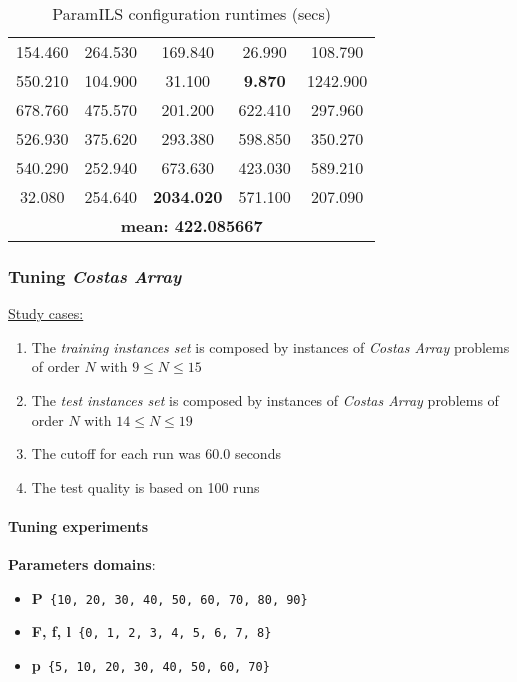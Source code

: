 \begin{table}[H]
\caption{ParamILS configuration runtimes (secs)}
\centering
\renewcommand{\arraystretch}{1.2}
\begin{tabular}{|ccccc|}
	\hline
	154.460 & 264.530 & 169.840 & 26.990 & 108.790 \\ 
	550.210 & 104.900 & 31.100 & \textcolor{naranja}{\bf 9.870} & 1242.900 \\  
	\hline 
	678.760 & 475.570 & 201.200 & 622.410 & 297.960 \\ 
	526.930 & 375.620 & 293.380 & 598.850 & 350.270 \\  
	\hline 
	540.290 & 252.940 & 673.630 & 423.030 & 589.210 \\ 
	32.080 & 254.640 & \textcolor{intenso}{\bf 2034.020} & 571.100 & 207.090 \\  
	\hline 
	\multicolumn{5}{|c|}{\bf mean: 422.085667}\\
	\hline
\end{tabular}
\label{table:testaigood}
\end{table} 

\subsubsection{ Tuning \textbf{\it Costas Array}}

\underline{Study cases:}
\begin{enumerate}
	\item The {\it training instances set} is composed by instances of {\it Costas Array} problems of order $N$ with $9 \leq N \leq 15$
	\item The {\it test instances set} is composed by instances of {\it Costas Array} problems of order $N$ with $14 \leq N \leq 19$
	\item The cutoff for each run was 60.0 seconds
	\item The test quality is based on 100 runs
\end{enumerate}

\paragraph{ Tuning experiments}

{\bf Parameters domains}:

\begin{itemize}[itemsep=0.2mm]
	\item {\bf P}\texttt{ \{10, 20, 30, 40, 50, 60, 70, 80, 90\}}
	\item {\bf F, f, l}\texttt{ \{0, 1, 2, 3, 4, 5, 6, 7, 8\}}
	\item {\bf p}\texttt{ \{5, 10, 20, 30, 40, 50, 60, 70\}}
\end{itemize}

